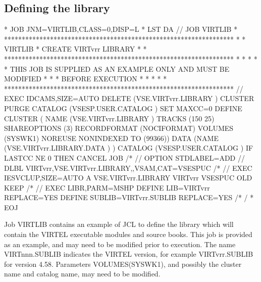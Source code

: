 \documentclass[letterpaper,10pt,english]{sphinxmanual}
\begin{document}
\subsection{Defining the library}
\label{\detokenize{Installation_Guide:defining-the-library}}
\begin{sphinxVerbatim}[commandchars=\\\{\}]
* \PYGZdl{}\PYGZdl{} JOB JNM=VIRTLIB,CLASS=0,DISP=L
* \PYGZdl{}\PYGZdl{} LST DA
// JOB VIRTLIB
* *****************************************************************
* * VIRTLIB * CREATE VIRTvrr LIBRARY                              *
* *****************************************************************
* *                                                               *
* * THIS JOB IS SUPPLIED AS AN EXAMPLE ONLY AND MUST BE MODIFIED  *
* * BEFORE EXECUTION                                              *
* *                                                               *
* *****************************************************************
// EXEC IDCAMS,SIZE=AUTO
 DELETE (VSE.VIRTvrr.LIBRARY ) \PYGZhy{}
          CLUSTER \PYGZhy{}
          PURGE \PYGZhy{}
    CATALOG (VSESP.USER.CATALOG )
 SET MAXCC=0
 DEFINE CLUSTER ( \PYGZhy{}
            NAME (VSE.VIRTvrr.LIBRARY ) \PYGZhy{}
            TRACKS (150 25) \PYGZhy{}
            SHAREOPTIONS (3) \PYGZhy{}
            RECORDFORMAT (NOCIFORMAT) \PYGZhy{}
            VOLUMES (SYSWK1) \PYGZhy{}
            NOREUSE \PYGZhy{}
            NONINDEXED \PYGZhy{}
            TO (99366)) \PYGZhy{}
            DATA (NAME (VSE.VIRTvrr.LIBRARY.DATA ) ) \PYGZhy{}
            CATALOG (VSESP.USER.CATALOG )
 IF LASTCC NE 0 THEN CANCEL JOB
/*
// OPTION STDLABEL=ADD
// DLBL VIRTvrr,\PYGZsq{}VSE.VIRTvrr.LIBRARY\PYGZsq{},,VSAM,CAT=VSESPUC
/*
// EXEC IESVCLUP,SIZE=AUTO
A VSE.VIRTvrr.LIBRARY        VIRTvrr VSESPUC OLD KEEP
/*
// EXEC LIBR,PARM=\PYGZsq{}MSHP\PYGZsq{}
              DEFINE LIB=VIRTvrr REPLACE=YES
              DEFINE SUBLIB=VIRTvrr.SUBLIB REPLACE=YES
/*
/\PYGZam{}
* \PYGZdl{}\PYGZdl{} EOJ
\end{sphinxVerbatim}


Job VIRTLIB contains an example of JCL to define the library which will contain the VIRTEL executable modules and source books. This job is provided as an example, and may need to be modified prior to execution. The name VIRTnnn.SUBLIB indicates the VIRTEL version, for example VIRTvrr.SUBLIB for version 4.58. Parameters VOLUMES(SYSWK1), and possibly the cluster name and catalog name, may need to be modified.
\end{document}
